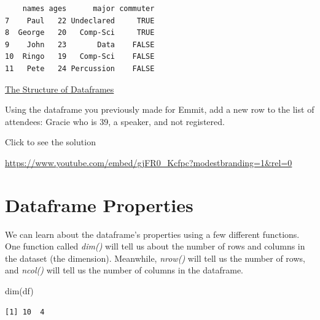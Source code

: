 \documentclass[
  letterpaper,
  DIV=11,
  numbers=noendperiod]{scrreprt}
\newenvironment{Shaded}{\begin{snugshade}}{\end{snugshade}}
\newcommand{\FunctionTok}[1]{\textcolor[rgb]{0.28,0.35,0.67}{#1}}
\newcommand{\NormalTok}[1]{\textcolor[rgb]{0.00,0.23,0.31}{#1}}
\begin{document}
\begin{verbatim}
    names ages      major commuter
7    Paul   22 Undeclared     TRUE
8  George   20   Comp-Sci     TRUE
9    John   23       Data    FALSE
10  Ringo   19   Comp-Sci    FALSE
11   Pete   24 Percussion    FALSE
\end{verbatim}

\begin{watch}{}{}
    \href{https://youtu.be/0BlLEFou1kM}{The Structure of Dataframes}
\end{watch}

\begin{tcolorbox}[enhanced jigsaw, leftrule=.75mm, arc=.35mm, coltitle=black, rightrule=.15mm, bottomrule=.15mm, toprule=.15mm, left=2mm, colbacktitle=quarto-callout-tip-color!10!white, title=\textcolor{quarto-callout-tip-color}{\faLightbulb}\hspace{0.5em}{Try it Out}, toptitle=1mm, breakable, colframe=quarto-callout-tip-color-frame, bottomtitle=1mm, titlerule=0mm, colback=white, opacityback=0, opacitybacktitle=0.6]

Using the dataframe you previously made for Emmit, add a new row to the
list of attendees: Gracie who is 39, a speaker, and not registered.

Click to see the solution

\url{https://www.youtube.com/embed/gjFR0_Kcfpc?modestbranding=1&rel=0}

\end{tcolorbox}

\section{Dataframe Properties}\label{dataframe-properties}

We can learn about the dataframe's properties using a few different
functions. One function called \emph{dim()} will tell us about the
number of rows and columns in the dataset (the dimension). Meanwhile,
\emph{nrow()} will tell us the number of rows, and \emph{ncol()} will
tell us the number of columns in the dataframe.

\begin{Shaded}
\begin{Highlighting}[]
\FunctionTok{dim}\NormalTok{(df)}
\end{Highlighting}
\end{Shaded}

\begin{verbatim}
[1] 10  4
\end{verbatim}
\end{document}
